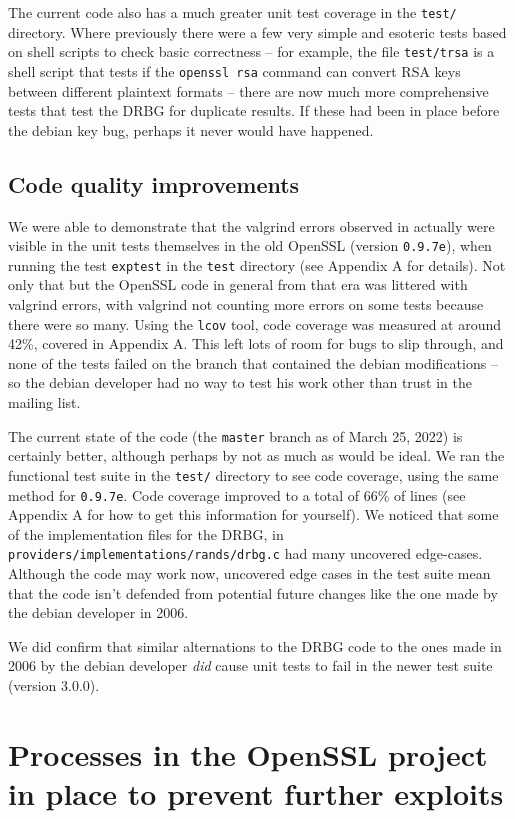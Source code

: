 \documentclass[conference]{IEEEtran}
\begin{document}
The current code also has a much greater unit test coverage in the
\verb|test/| directory. Where previously there were a few very simple
and esoteric tests based on shell scripts to check basic correctness
-- for example, the file \verb|test/trsa| is a shell script that tests
if the \verb|openssl rsa| command can convert RSA keys between
different plaintext formats -- there are now much more comprehensive
tests that test the DRBG for duplicate results. If these had been in
place before the debian key bug, perhaps it never would have happened.

\subsection{Code quality improvements}
We were able to demonstrate that the valgrind errors observed in
\cite{2} actually were visible in the unit tests themselves in the old
OpenSSL (version \verb|0.9.7e|), when running the test \verb|exptest|
in the \verb|test| directory (see Appendix A for details). Not only
that but the OpenSSL code in general from that era was littered with
valgrind errors, with valgrind not counting more errors on some tests
because there were so many. Using the \verb|lcov| tool, code coverage
was measured at around 42\%, covered in Appendix A. This left lots of
room for bugs to slip through, and none of the tests failed on the
branch that contained the debian modifications -- so the debian
developer had no way to test his work other than trust in the mailing
list.

The current state of the code (the \verb|master| branch as of March
25, 2022) is certainly better, although perhaps by not as much as
would be ideal. We ran the functional test suite in the \verb|test/|
directory to see code coverage, using the same method for
\verb|0.9.7e|. Code coverage improved to a total of 66\% of lines (see
Appendix A for how to get this information for yourself). We noticed
that some of the implementation files for the DRBG, in
\verb|providers/implementations/rands/drbg.c| had many uncovered
edge-cases. Although the code may work now, uncovered edge cases in
the test suite mean that the code isn't defended from potential future
changes like the one made by the debian developer in 2006.

We did confirm that similar alternations to the DRBG code to the ones
made in 2006 by the debian developer \emph{did} cause unit tests to
fail in the newer test suite (version 3.0.0).

\section{Processes in the OpenSSL project in place to prevent further exploits}
\end{document}
